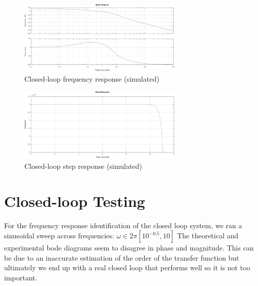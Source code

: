\documentclass[11pt]{article}
\begin{document}
\begin{figure}
\centering
    \includegraphics[width=0.7\textwidth]{bodecompsense.pdf}
    \caption{Closed-loop frequency response (simulated)}
    \label{fig:bodecompsense}
\end{figure}
\begin{figure}
\centering
    \includegraphics[width=0.7\textwidth]{bodecompsenseStep.pdf}
    \caption{Closed-loop step response (simulated)}
    \label{fig:stepresponse}
\end{figure}

\section{Closed-loop Testing}
\label{sec:closedLoop}



For the frequency response identification of the closed loop system, we ran a sinusoidal sweep across frequencies: $\omega \in 2 \pi [10^{-0.5},10]$
The theoretical and experimental bode diagrams seem to disagree in phase and magnitude. This can be due to an inaccurate estimation of the order of the transfer function but ultimately we end up with a real closed loop that performs well so it is not too important.
\end{document}
